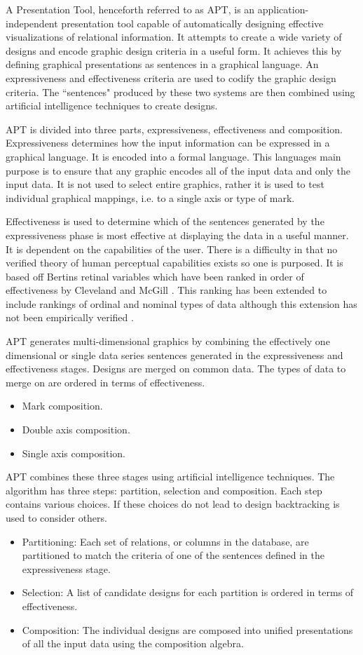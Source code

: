 \documentclass[a4paper, 11pt, titlepage, onehalfspacing]{report}
\begin{document}
A Presentation Tool, henceforth referred to as APT, is an application-independent presentation tool capable of automatically designing effective visualizations of relational information. It attempts to create a wide variety of designs and encode graphic design criteria in a useful form. It achieves this by defining graphical presentations as sentences in a graphical language. An expressiveness and effectiveness criteria are used to codify the graphic design criteria. The ``sentences" produced by these two systems are then combined using artificial intelligence techniques to create designs.

APT is divided into three parts, expressiveness, effectiveness and composition. Expressiveness determines how the input information can be expressed in a graphical language. It is encoded into a formal language. This languages main purpose is to ensure that any graphic encodes all of the input data and only the input data. It is not used to select entire graphics, rather it is used to test individual graphical mappings, i.e. to a single axis or type of mark.

Effectiveness is used to determine which of the sentences generated by the expressiveness phase is most effective at displaying the data in a useful manner. It is dependent on the capabilities of the user. There is a difficulty in that no verified theory of human perceptual capabilities exists so one is purposed. It is based off Bertins retinal variables \cite{bertin1973semiologie} which have been ranked in order of effectiveness by Cleveland and McGill \cite{cleveland1984graphical}. This ranking has been extended to include rankings of ordinal and nominal types of data although this extension has not been empirically verified \cite{card1999readings}.

APT generates multi-dimensional graphics by combining the effectively one dimensional or single data series sentences generated in the expressiveness and effectiveness stages. Designs are merged on common data. The types of data to merge on are ordered in terms of effectiveness.
\begin{itemize}
\item Mark composition.
\item Double axis composition.
\item Single axis composition.
\end{itemize}
APT combines these three stages using artificial intelligence techniques. The algorithm has three steps: partition, selection and composition. Each step contains various choices. If these choices do not lead to design backtracking is used to consider others.
\begin{itemize}
\item Partitioning: Each set of relations, or columns in the database, are partitioned to match the criteria of one of the sentences defined in the expressiveness stage.
\item Selection: A list of candidate designs for each partition is ordered in terms of effectiveness. 
\item Composition: The individual designs are composed into unified presentations of all the input data using the composition algebra.
\end{itemize}
\end{document}
